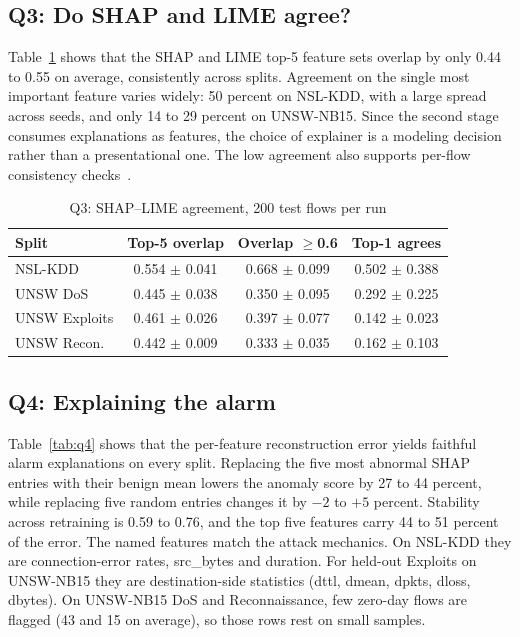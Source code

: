 \documentclass[conference]{IEEEtran}
\begin{document}
\subsection{Q3: Do SHAP and LIME agree?}
Table~\ref{tab:q3} shows that the SHAP and LIME top-5 feature sets overlap by only 0.44 to 0.55 on average, consistently across splits. Agreement on the single most important feature varies widely: 50 percent on NSL-KDD, with a large spread across seeds, and only 14 to 29 percent on UNSW-NB15. Since the second stage consumes explanations as features, the choice of explainer is a modeling decision rather than a presentational one. The low agreement also supports per-flow consistency checks~\cite{nugraha2025versatile}.

\begin{table}[t]
\caption{Q3: SHAP--LIME agreement, 200 test flows per run}
\label{tab:q3}
\centering
\begin{tabular}{lccc}
\toprule
Split & Top-5 overlap & Overlap $\geq$0.6 & Top-1 agrees \\
\midrule
NSL-KDD & 0.554 $\pm$ 0.041 & 0.668 $\pm$ 0.099 & 0.502 $\pm$ 0.388 \\
UNSW DoS & 0.445 $\pm$ 0.038 & 0.350 $\pm$ 0.095 & 0.292 $\pm$ 0.225 \\
UNSW Exploits & 0.461 $\pm$ 0.026 & 0.397 $\pm$ 0.077 & 0.142 $\pm$ 0.023 \\
UNSW Recon. & 0.442 $\pm$ 0.009 & 0.333 $\pm$ 0.035 & 0.162 $\pm$ 0.103 \\
\bottomrule
\end{tabular}
\end{table}

\subsection{Q4: Explaining the alarm}
Table~\ref{tab:q4} shows that the per-feature reconstruction error yields faithful alarm explanations on every split. Replacing the five most abnormal SHAP entries with their benign mean lowers the anomaly score by 27 to 44 percent, while replacing five random entries changes it by $-2$ to $+5$ percent. Stability across retraining is 0.59 to 0.76, and the top five features carry 44 to 51 percent of the error. The named features match the attack mechanics. On NSL-KDD they are connection-error rates, src\_bytes and duration. For held-out Exploits on UNSW-NB15 they are destination-side statistics (dttl, dmean, dpkts, dloss, dbytes). On UNSW-NB15 DoS and Reconnaissance, few zero-day flows are flagged (43 and 15 on average), so those rows rest on small samples.
\end{document}
